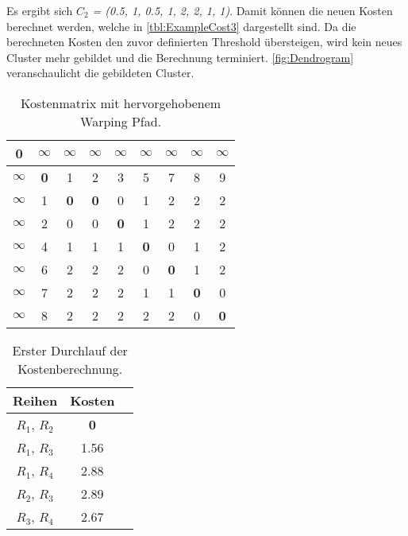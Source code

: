 Es ergibt sich \emph{$C_{2}$ = (0.5, 1, 0.5, 1, 2, 2, 1, 1)}.
Damit können die neuen Kosten berechnet werden,
welche in \autoref{tbl:ExampleCost3} dargestellt sind.
Da die berechneten Kosten den zuvor definierten Threshold übersteigen,
wird kein neues Cluster mehr gebildet und die Berechnung terminiert.
\autoref{fig:Dendrogram} veranschaulicht die gebildeten Cluster.
\begin{table}[ht]
    \begin{center}
        \begin{tabular}{ |c||c|c|c|c|c|c|c|c| } 
         \hline
         \textbf{0} & $\infty$ & $\infty$ & $\infty$
         & $\infty$ & $\infty$ & $\infty$ & $\infty$ & $\infty$ \\
         \hline
         \hline
         $\infty$ &\textbf{0} & 1 & 2 & 3 & 5 & 7 & 8 & 9 \\
         \hline
         $\infty$ & 1 & \textbf{0} & \textbf{0} & 0 & 1 & 2 & 2 & 2 \\
         \hline
         $\infty$ & 2 & 0 & 0 & \textbf{0} & 1 & 2 & 2 & 2 \\
         \hline
         $\infty$ & 4 & 1 & 1 & 1 & \textbf{0} & 0 & 1 & 2 \\
         \hline
         $\infty$ & 6 & 2 & 2 & 2 & 0 & \textbf{0} & 1 & 2 \\
         \hline
         $\infty$ & 7 & 2 & 2 & 2 & 1 & 1 & \textbf{0} & 0 \\
         \hline
         $\infty$ & 8 & 2 & 2 & 2 & 2 & 2 & 0 & \textbf{0} \\
         \hline
        \end{tabular}
        \caption{Kostenmatrix mit hervorgehobenem Warping Pfad.}
        \label{tbl:ExampleMatrix}
    \end{center}
\end{table}
\begin{table}[ht]
    \begin{center}
        \begin{tabular}{ |c|c|c| } 
         \hline
         Reihen & Kosten \\
         \hline \hline
         $R_{1}$, $R_{2}$ & \textbf{0} \\
         \hline
         $R_{1}$, $R_{3}$ & 1.56 \\
         \hline
         $R_{1}$, $R_{4}$ & 2.88 \\
         \hline
         $R_{2}$, $R_{3}$ & 2.89 \\
         \hline
         $R_{3}$, $R_{4}$ & 2.67 \\
         \hline
        \end{tabular}
        \caption{Erster Durchlauf der Kostenberechnung.}
        \label{tbl:ExampleCost1}
    \end{center}
\end{table}
